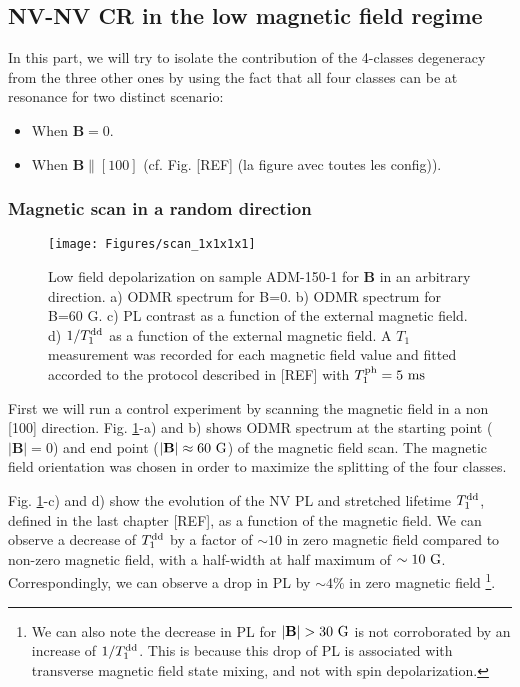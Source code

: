 \documentclass[a4paper,11pt]{report}
\begin{document}
\subsection{NV-NV CR in the low magnetic field regime}


In this part, we will try to isolate the contribution of the 4-classes degeneracy from the three other ones by using the fact that all four classes can be at resonance for two distinct scenario:
\begin{itemize}
\item When $\mathbf{B}=0$.
\item When $\mathbf{B}\parallel [100]$ (cf. Fig. [REF] (la figure avec toutes les config)).
\end{itemize}

\subsubsection{Magnetic scan in a random direction}

\begin{figure}[h]
\centering
\texttt{[image: Figures/scan\_1x1x1x1]}
\caption{Low field depolarization on sample ADM-150-1 for $\mathbf{B}$ in an arbitrary direction. a) ODMR spectrum for B=0. b) ODMR spectrum for B=60 G. c) PL contrast as a function of the external magnetic field. d) $1/T_1^{\rm dd}$ as a function of the external magnetic field. A $T_1$ measurement was recorded for each magnetic field value and fitted accorded to the protocol described in [REF] with $T_1^{\rm ph}=5\ \rm ms$}
\label{scan 1x1x1x1}
\end{figure}

First we will run a control experiment by scanning the magnetic field in a non [100] direction. Fig. \ref{scan 1x1x1x1}-a) and b) shows ODMR spectrum at the starting point ($|\mathbf{B}|=0$) and end point ($|\mathbf{B}|\approx 60\ \rm G$) of the magnetic field scan. The magnetic field orientation was chosen in order to maximize the splitting of the four classes.

Fig. \ref{scan 1x1x1x1}-c) and d) show the evolution of the NV PL and stretched lifetime $T_1^{\rm dd}$, defined in the last chapter [REF], as a function of the magnetic field. We can observe a decrease of $T_1^{\rm dd}$ by a factor of $\sim 10$ in zero magnetic field compared to non-zero magnetic field, with a half-width at half maximum of $\sim 10\ \rm G$. Correspondingly, we can observe a drop in PL by $\sim 4\%$ in zero magnetic field \footnote{We can also note the decrease in PL for $|\mathbf{B}|> 30\ \rm G$ is not corroborated by an increase of $1/T_1^{\rm dd}$. This is because this drop of PL is associated with transverse magnetic field state mixing, and not with spin depolarization.}. 
\end{document}
